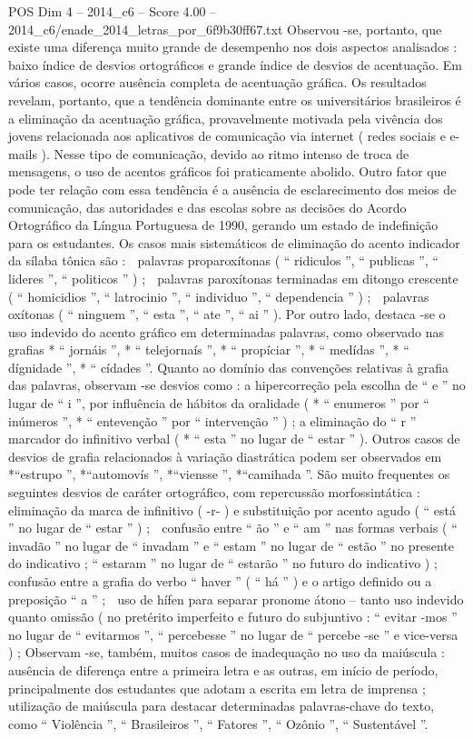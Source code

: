 \begin{textsample}{POS Dim 4 – 2014\_c6 – Score 4.00 – 2014\_c6/enade\_2014\_letras\_por\_6f9b30ff67.txt}
Observou -se, portanto, que existe uma diferença muito grande de desempenho nos dois aspectos analisados : baixo índice de desvios ortográficos e grande índice de desvios de acentuação.
Em vários casos, ocorre ausência completa de acentuação gráfica.
Os resultados revelam, portanto, que a tendência dominante entre os universitários brasileiros é a eliminação da acentuação gráfica, provavelmente motivada pela vivência dos jovens relacionada aos aplicativos de comunicação via internet ( redes sociais e e-mails ).
Nesse tipo de comunicação, devido ao ritmo intenso de troca de mensagens, o uso de acentos gráficos foi praticamente abolido.
Outro fator que pode ter relação com essa tendência é a ausência de esclarecimento dos meios de comunicação, das autoridades e das escolas sobre as decisões do Acordo Ortográfico da Língua Portuguesa de 1990, gerando um estado de indefinição para os estudantes.
Os casos mais sistemáticos de eliminação do acento indicador da sílaba tônica são :  palavras proparoxítonas ( “ ridiculos ”, “ publicas ”, “ lideres ”, “ politicos ” ) ;  palavras paroxítonas terminadas em ditongo crescente ( “ homicidios ”, “ latrocinio ”, “ individuo ”, “ dependencia ” ) ;  palavras oxítonas ( “ ninguem ”, “ esta ”, “ ate ”, “ ai ” ).
Por outro lado, destaca -se o uso indevido do acento gráfico em determinadas palavras, como observado nas grafias * “ jornáis ”, * “ telejornaís ”, * “ propíciar ”, * “ medídas ”, * “ dígnidade ”, * “ cídades ”.
Quanto ao domínio das convenções relativas à grafia das palavras, observam -se desvios como : a hipercorreção pela escolha de “ e ” no lugar de “ i ”, por influência de hábitos da oralidade ( * “ enumeros ” por “ inúmeros ”, * “ entevenção ” por “ intervenção ” ) ; a eliminação do “ r ” marcador do infinitivo verbal ( * “ esta ” no lugar de “ estar ” ).
Outros casos de desvios de grafia relacionados à variação diastrática podem ser observados em *“estrupo ”, *“automovís ”, *“viensse ”, *“camihada ”.
São muito frequentes os seguintes desvios de caráter ortográfico, com repercussão morfossintática :  eliminação da marca de infinitivo ( -r- ) e substituição por acento agudo ( “ está ” no lugar de “ estar ” ) ;  confusão entre “ ão ” e “ am ” nas formas verbais ( “ invadão ” no lugar de “ invadam ” e “ estam ” no lugar de “ estão ” no presente do indicativo ; “ estaram ” no lugar de “ estarão ” no futuro do indicativo ) ;  confusão entre a grafia do verbo “ haver ” ( “ há ” ) e o artigo definido ou a preposição “ a ” ;  uso de hífen para separar pronome átono – tanto uso indevido quanto omissão ( no pretérito imperfeito e futuro do subjuntivo : “ evitar -mos ” no lugar de “ evitarmos ”, “ percebesse ” no lugar de “ percebe -se ” e vice-versa ) ; Observam -se, também, muitos casos de inadequação no uso da maiúscula : ausência de diferença entre a primeira letra e as outras, em início de período, principalmente dos estudantes que adotam a escrita em letra de imprensa ; utilização de maiúscula para destacar determinadas palavras-chave do texto, como “ Violência ”, “ Brasileiros ”, “ Fatores ”, “ Ozônio ”, “ Sustentável ”.

\end{textsample}
